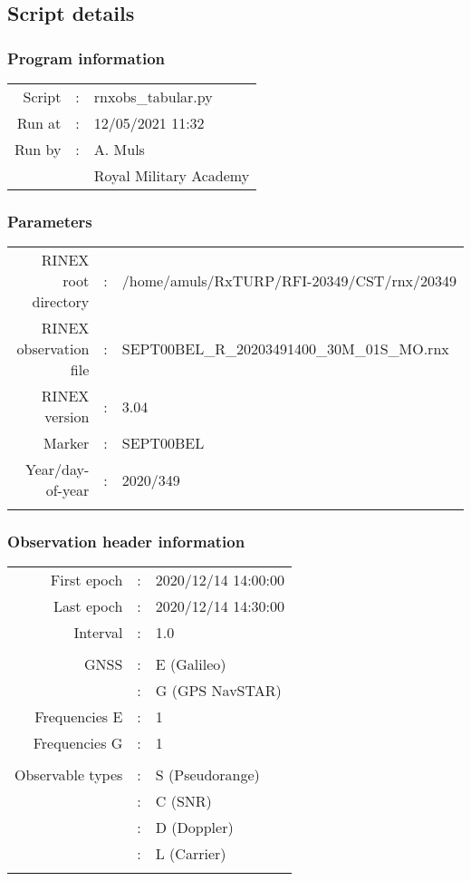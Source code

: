 \subsection{Script details}%
\label{subsec:Scriptdetails}%
\subsubsection{Program information}%
\label{ssubsec:Programinformation}%
\setlength{\tabcolsep}{4pt}%
\begin{longtabu}[l]{rcl}%
Script&:&rnxobs\_tabular.py\\%
Run at&:&12/05/2021 11:32\\%
Run by&:&A. Muls\\%
&&Royal Military Academy\\%
\end{longtabu}

%
\subsubsection{Parameters}%
\label{ssubsec:Parameters}%
\setlength{\tabcolsep}{4pt}%
\begin{longtabu}[l]{rcl}%
RINEX root directory&:&/home/amuls/RxTURP/RFI{-}20349/CST/rnx/20349\\%
RINEX observation file&:&SEPT00BEL\_R\_20203491400\_30M\_01S\_MO.rnx\\%
RINEX version&:&3.04\\%
Marker&:&SEPT00BEL\\%
Year/day{-}of{-}year&:&2020/349\\%
&&\\%
\end{longtabu}

%
\subsubsection{Observation header information}%
\label{ssubsec:Observationheaderinformation}%
\setlength{\tabcolsep}{4pt}%
\begin{longtabu}[l]{rcl}%
First epoch&:&2020/12/14 14:00:00\\%
Last epoch&:&2020/12/14 14:30:00\\%
Interval&:&1.0\\%
&&\\%
GNSS&:&E (Galileo) \\%
&:&G (GPS NavSTAR) \\%
Frequencies E&:&1\\%
Frequencies G&:&1\\%
&&\\%
Observable types&:&S (Pseudorange) \\%
&:&C (SNR) \\%
&:&D (Doppler) \\%
&:&L (Carrier) \\%
&&\\%
\end{longtabu}

